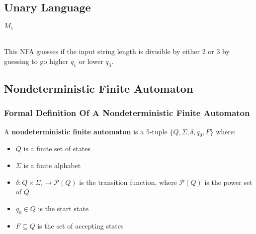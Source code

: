 \documentclass[11pt,a4paper]{article}
\begin{document}
\subsection{Unary Language}
\begin{example} $M_1$

     \\

    This NFA guesses if the input string length is divisible by either 2 or 3 by guessing to go higher $q_1$ or lower $q_3$.
\end{example}

\subsection{Nondeterministic Finite Automaton}
\subsubsection{Formal Definition Of A Nondeterministic Finite Automaton}
\begin{definition}
    A \textbf{nondeterministic finite automaton} is a 5-tuple $\{Q,\Sigma,\delta,q_0,F\}$ where:
    \begin{itemize}
        \item $Q$ is a finite set of states
        \item $\Sigma$ is a finite alphabet
        \item $\delta :Q\times\Sigma_{\epsilon}\rightarrow \mathcal{P}(Q)$ is the transition function, where $\mathcal{P}(Q)$ is the power set of $Q$
        \item $q_0\in Q$ is the start state
        \item $F\subseteq Q$ is the set of accepting states
    \end{itemize}
\end{definition}
\end{document}
